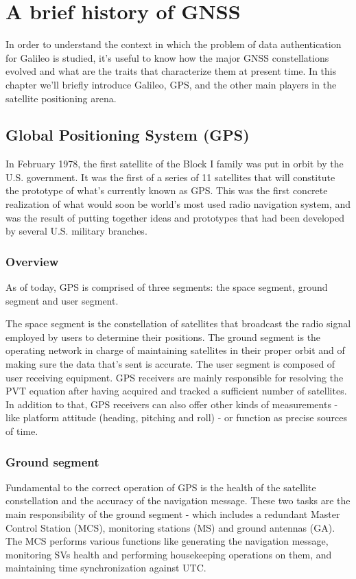 
\chapter{A brief history of GNSS}
\label{ch:gnss_intro}

In order to understand the context in which the problem of data authentication
for Galileo is studied, it's useful to know how the major GNSS constellations
evolved and what are the traits that characterize them at present time. In
this chapter we'll briefly introduce Galileo, GPS, and the other main players
in the satellite positioning arena.

\section{Global Positioning System (GPS)}
In February 1978, the first satellite of the Block I family was put in orbit by
the U.S. government. It was the first of a series of 11 satellites that will
constitute the prototype of what's currently known as GPS. This was the first
concrete realization of what would soon be world's most used radio navigation
system, and was the result of putting together ideas and prototypes that had
been developed by several U.S. military branches.

\subsection{Overview}
As of today, GPS is comprised of three segments: the space segment, ground
segment and user segment.

The space segment is the constellation of satellites that broadcast the radio
signal employed by users to determine their positions. The ground segment is the
operating network in charge of maintaining satellites in their proper orbit and
of making sure the data that's sent is accurate. The user segment is composed of
user receiving equipment. GPS receivers are mainly responsible for resolving the
PVT equation after having acquired and tracked a sufficient number of
satellites. In addition to that, GPS receivers can also offer other kinds of
measurements - like platform attitude (heading, pitching and roll) - or function
as precise sources of time.

\subsection{Ground segment}
Fundamental to the correct operation of GPS is the health of the satellite
constellation and the accuracy of the navigation message. These two tasks are
the main responsibility of the ground segment - which includes a redundant
Master Control Station (MCS), monitoring stations (MS) and ground antennas (GA).
The MCS performs various functions like generating the navigation message,
monitoring SVs health and performing housekeeping operations on them, and
maintaining time synchronization against UTC.

